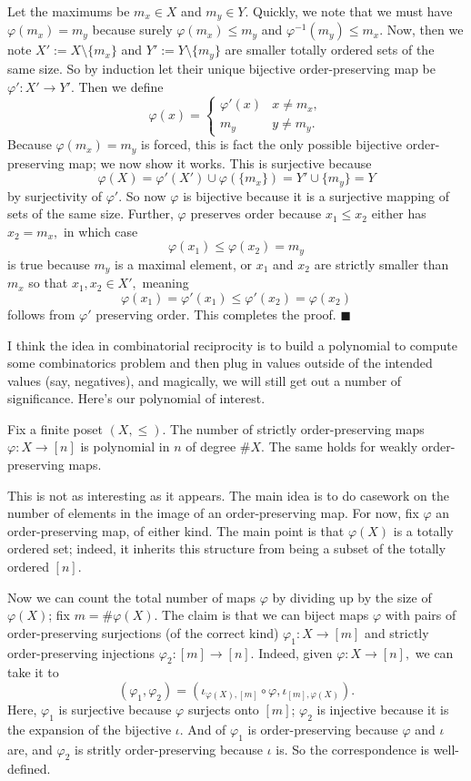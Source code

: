 Let the maximums be $m_x\in X$ and $m_y\in Y.$ Quickly, we note that we must have $\varphi(m_x)=m_y$ because surely $\varphi(m_x)\le m_y$ and $\varphi^{-1}(m_y)\le m_x.$ Now, then we note $X':=X\setminus\{m_x\}$ and $Y':=Y\setminus\{m_y\}$ are smaller totally ordered sets of the same size. So by induction let their unique bijective order-preserving map be $\varphi':X'\to Y'.$ Then we define
\[\varphi(x)=\begin{cases}
    \varphi'(x) & x\ne m_x, \\
    m_y & y\ne m_y.
\end{cases}\]
Because $\varphi(m_x)=m_y$ is forced, this is fact the only possible bijective order-preserving map; we now show it works. This is surjective because
\[\varphi(X)=\varphi'(X')\cup\varphi(\{m_x\})=Y'\cup\{m_y\}=Y\]
by surjectivity of $\varphi'.$ So now $\varphi$ is bijective because it is a surjective mapping of sets of the same size. Further, $\varphi$ preserves order because $x_1\le x_2$ either has $x_2=m_x,$ in which case
\[\varphi(x_1)\le\varphi(x_2)=m_y\]
is true because $m_y$ is a maximal element, or $x_1$ and $x_2$ are strictly smaller than $m_x$ so that $x_1,x_2\in X',$ meaning
\[\varphi(x_1)=\varphi'(x_1)\le\varphi'(x_2)=\varphi(x_2)\]
follows from $\varphi'$ preserving order. This completes the proof. $\blacksquare$

I think the idea in combinatorial reciprocity is to build a polynomial to compute some combinatorics problem and then plug in values outside of the intended values (say, negatives), and magically, we will still get out a number of significance. Here's our polynomial of interest.
\begin{proposition}
    Fix a finite poset $(X,\le).$ The number of strictly order-preserving maps $\varphi:X\to[n]$ is polynomial in $n$ of degree $\#X.$ The same holds for weakly order-preserving maps.
\end{proposition}
This is not as interesting as it appears. The main idea is to do casework on the number of elements in the image of an order-preserving map. For now, fix $\varphi$ an order-preserving map, of either kind. The main point is that $\varphi(X)$ is a totally ordered set; indeed, it inherits this structure from being a subset of the totally ordered $[n].$

Now we can count the total number of maps $\varphi$ by dividing up by the size of $\varphi(X)$; fix $m=\#\varphi(X).$ The claim is that we can biject maps $\varphi$ with pairs of order-preserving surjections (of the correct kind) $\varphi_1:X\to[m]$ and strictly order-preserving injections $\varphi_2:[m]\to[n].$ Indeed, given $\varphi:X\to[n],$ we can take it to
\[(\varphi_1,\varphi_2)=(\iota_{\varphi(X),[m]}\circ\varphi,\iota_{[m],\varphi(X)}).\]
Here, $\varphi_1$ is surjective because $\varphi$ surjects onto $[m]$; $\varphi_2$ is injective because it is the expansion of the bijective $\iota.$ And of $\varphi_1$ is order-preserving because $\varphi$ and $\iota$ are, and $\varphi_2$ is stritly order-preserving because $\iota$ is. So the correspondence is well-defined.

